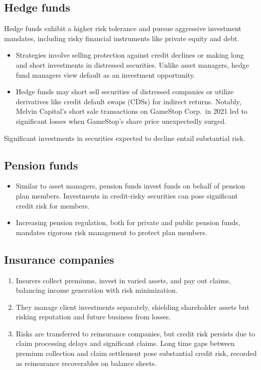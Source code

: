 \subsection*{Hedge funds}
Hedge funds exhibit a higher risk tolerance and pursue aggressive investment
mandates, including risky financial instruments like private equity and debt.
\begin{itemize}
\item {} Strategies involve selling protection
against credit declines or making long and short investments in distressed
securities. Unlike asset managers, hedge fund managers view default as an
investment opportunity.
\item {} Hedge funds may short sell securities of distressed
companies or utilize derivatives like credit default swaps (CDSs) for indirect
returns. Notably, Melvin Capital's short sale transactions on GameStop Corp.\ in
2021 led to significant losses when GameStop's share price unexpectedly surged.
\end{itemize}
Significant investments in securities expected to decline entail substantial
risk.

\subsection*{Pension funds}
\begin{itemize}
\item {} Similar to asset managers, pension funds
invest funds on behalf of pension plan members. Investments in credit-risky
securities can pose significant credit risk for members.
\item {} Increasing pension regulation, both for
private and public pension funds, mandates rigorous risk management to protect
plan members.
\end{itemize}

\subsection*{Insurance companies}
\begin{enumerate}
\item {} Insurers collect premiums, invest in varied assets,
and pay out claims, balancing income generation with risk minimization.
\item {} They manage client investments separately, shielding
shareholder assets but risking reputation and future business from losses.
\item {} Risks are transferred to reinsurance companies, but
credit risk persists due to claim processing delays and significant claims. Long
time gaps between premium collection and claim settlement pose substantial
credit risk, recorded as reinsurance recoverables on balance sheets.
\end{enumerate}

